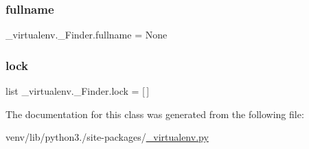 \subsubsection{\texorpdfstring{fullname}{fullname}}
{\footnotesize\ttfamily \+\_\+virtualenv.\+\_\+\+Finder.\+fullname = None\hspace{0.3cm}{\ttfamily [static]}}

\mbox{\label{class__virtualenv_1_1__Finder_aa9359c1e8bce6138077924af89fbc99a}} 
\subsubsection{\texorpdfstring{lock}{lock}}
{\footnotesize\ttfamily list \+\_\+virtualenv.\+\_\+\+Finder.\+lock = \mbox{[}$\,$\mbox{]}\hspace{0.3cm}{\ttfamily [static]}}



The documentation for this class was generated from the following file\+:\begin{DoxyCompactItemize}
\item 
venv/lib/python3./site-\/packages/\hyperlink{__virtualenv_8py}{\+\_\+virtualenv.\+py}\end{DoxyCompactItemize}
